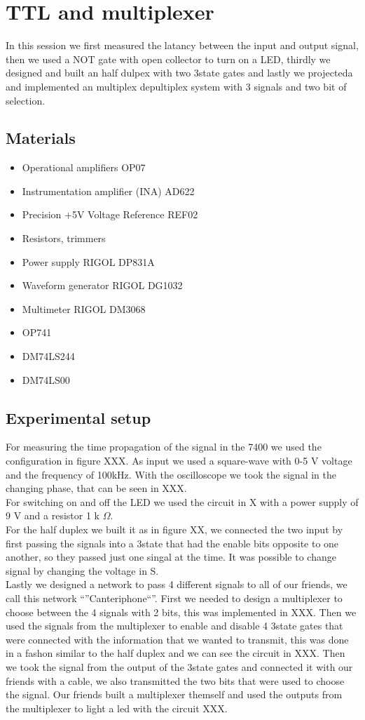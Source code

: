 \chapter{TTL and multiplexer}
In this session we first measured the latancy between the input and output signal, then we used a NOT gate with open collector to turn on a LED, thirdly we designed and built an half dulpex with two 3state gates and lastly we projecteda and implemented an multiplex depultiplex system with 3 signals and two bit of selection.

\section{Materials}
\begin{itemize}
\item Operational amplifiers OP07
\item Instrumentation amplifier (INA) AD622
\item Precision +5V Voltage Reference REF02
\item Resistors, trimmers
\item Power supply RIGOL DP831A
\item Waveform generator RIGOL DG1032
\item Multimeter RIGOL DM3068
\item OP741
\item DM74LS244
\item DM74LS00
\end{itemize}
\section{Experimental setup}
For measuring the time propagation of the signal in the 7400 we used the configuration in figure XXX. As input we used a square-wave with 0-5 V voltage and the frequency of 100kHz. With the oscilloscope we took the signal in the changing phase, that can be seen in XXX.\\
For switching on and off the LED we used the circuit in X with a power supply of 9 V and a resistor 1  k $\Omega$.\\
For the half duplex we built it as in figure XX, we connected the two input by first passing the signals into a  3state that had the enable bits opposite to one another, so they passed just one singal at the time. It was possible to change signal by changing the voltage in S.\\
Lastly we designed a network to pass 4 different signals to all of our friends, we call this network ``''Canteriphone``''. First we needed to design a multiplexer to choose between the 4 signals with 2 bits, this was implemented in XXX. Then we used the signals from the multiplexer to enable and disable 4 3state gates that were connected with the information that we wanted to transmit, this was done in a fashon similar to the half duplex and we can see the circuit in XXX. Then we took the signal from the output of the 3state gates and connected it with our friends with a cable, we also transmitted the two bits that were used to choose  the signal. Our friends built a multiplexer themself and used the outputs from the multiplexer to light a led with the circuit XXX.